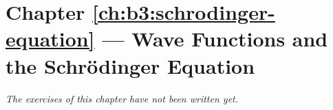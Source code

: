 \section*{Chapter \ref{ch:b3:schrodinger-equation} --- Wave Functions and the Schr\"odinger Equation}


\emph{The exercises of this chapter have not been written yet.}
